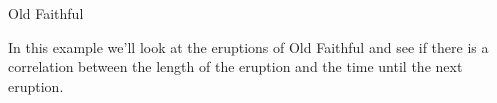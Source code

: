 \documentclass[11pt]{beamer}
\begin{document}
\begin{frame}{
	\begin{minipage}[t]{0.55\textwidth}
		Old Faithful
	\end{minipage}
	\hfill
	\begin{minipage}[t]{0.35\textwidth}
		\flushright
	\end{minipage}
}{}
In this example we'll look at the eruptions of Old Faithful and see if there is a correlation between
the length of the eruption and the time until the next eruption.
\begin{center}
\end{center}
\end{frame}
\end{document}
